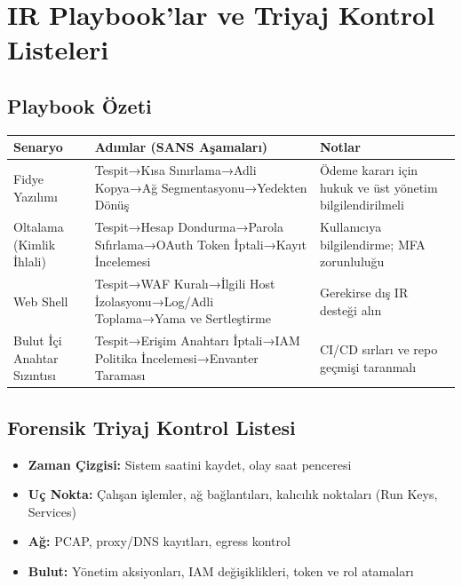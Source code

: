 \section{IR Playbook'lar ve Triyaj Kontrol Listeleri}

\subsection{Playbook Özeti}
\begin{longtable}{|p{3.3cm}|p{5.5cm}|p{6cm}|}
\hline
\rowcolor{tableheadcolor}
\textbf{Senaryo} & \textbf{Adımlar (SANS Aşamaları)} & \textbf{Notlar} \\
\hline
Fidye Yazılımı & Tespit→Kısa Sınırlama→Adli Kopya→Ağ Segmentasyonu→Yedekten Dönüş & Ödeme kararı için hukuk ve üst yönetim bilgilendirilmeli \\
\hline
Oltalama (Kimlik İhlali) & Tespit→Hesap Dondurma→Parola Sıfırlama→OAuth Token İptali→Kayıt İncelemesi & Kullanıcıya bilgilendirme; MFA zorunluluğu \\
\hline
Web Shell & Tespit→WAF Kuralı→İlgili Host İzolasyonu→Log/Adli Toplama→Yama ve Sertleştirme & Gerekirse dış IR desteği alın \\
\hline
Bulut İçi Anahtar Sızıntısı & Tespit→Erişim Anahtarı İptali→IAM Politika İncelemesi→Envanter Taraması & CI/CD sırları ve repo geçmişi taranmalı \\
\hline
\end{longtable}

\subsection{Forensik Triyaj Kontrol Listesi}
\begin{itemize}
  \item \textbf{Zaman Çizgisi:} Sistem saatini kaydet, olay saat penceresi
  \item \textbf{Uç Nokta:} Çalışan işlemler, ağ bağlantıları, kalıcılık noktaları (Run Keys, Services)
  \item \textbf{Ağ:} PCAP, proxy/DNS kayıtları, egress kontrol
  \item \textbf{Bulut:} Yönetim aksiyonları, IAM değişiklikleri, token ve rol atamaları
\end{itemize}



